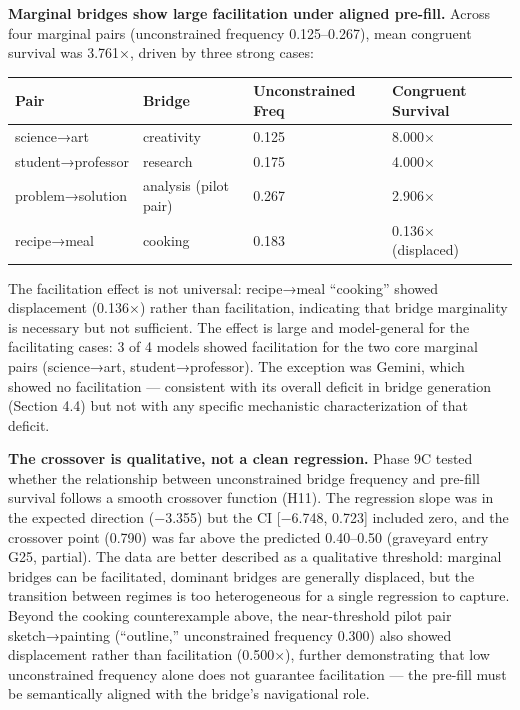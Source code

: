 \textbf{Marginal bridges show large facilitation under aligned pre-fill.} Across four marginal pairs (unconstrained frequency 0.125--0.267), mean congruent survival was 3.761×, driven by three strong cases:

\begin{longtable}[]{@{}llll@{}}
\toprule\noalign{}
Pair & Bridge & Unconstrained Freq & Congruent Survival \\
\midrule\noalign{}
\endhead
\bottomrule\noalign{}
\endlastfoot
science→art & creativity & 0.125 & 8.000× \\
student→professor & research & 0.175 & 4.000× \\
problem→solution & analysis (pilot pair) & 0.267 & 2.906× \\
recipe→meal & cooking & 0.183 & 0.136× (displaced) \\
\end{longtable}

The facilitation effect is not universal: recipe→meal ``cooking'' showed displacement (0.136×) rather than facilitation, indicating that bridge marginality is necessary but not sufficient. The effect is large and model-general for the facilitating cases: 3 of 4 models showed facilitation for the two core marginal pairs (science→art, student→professor). The exception was Gemini, which showed no facilitation --- consistent with its overall deficit in bridge generation (Section 4.4) but not with any specific mechanistic characterization of that deficit.

\textbf{The crossover is qualitative, not a clean regression.} Phase 9C tested whether the relationship between unconstrained bridge frequency and pre-fill survival follows a smooth crossover function (H11). The regression slope was in the expected direction (−3.355) but the CI {[}−6.748, 0.723{]} included zero, and the crossover point (0.790) was far above the predicted 0.40--0.50 (graveyard entry G25, partial). The data are better described as a qualitative threshold: marginal bridges can be facilitated, dominant bridges are generally displaced, but the transition between regimes is too heterogeneous for a single regression to capture. Beyond the cooking counterexample above, the near-threshold pilot pair sketch→painting (``outline,'' unconstrained frequency 0.300) also showed displacement rather than facilitation (0.500×), further demonstrating that low unconstrained frequency alone does not guarantee facilitation --- the pre-fill must be semantically aligned with the bridge's navigational role.

